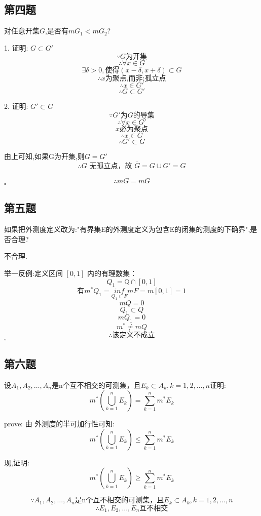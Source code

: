 \documentclass[a4paper]{article}
\begin{document}
    \subsection{第四题}
    对任意开集$G$,是否有$mG_1<mG_2$?

        1. 证明: $G \subset G'$
        \[\because G \text{为开集}\]
        \[\therefore \forall x \in G\]
        \[\exists \delta > 0,\text{使得}(x-\delta,x+\delta)\subset G\]
        \[\therefore x \text{为聚点,而非;孤立点}\]
        \[\therefore x \in G'\]
        \[\therefore G \subset G'\]

        2. 证明: $G' \subset G$
        \[\because G'\text{为} G \text{的导集}\]
        \[\therefore \forall x \in G'\]
        \[x \text{必为聚点}\]
        \[\therefore x \in G\]
        \[\therefore G' \subset G\]

        由上可知,如果G为开集,则$G = G'$
        \[\therefore G \text{ 无孤立点，故 } \overline{G} = G \cup G' = G\]

        \[\therefore m\overline{G}=mG\]
    \hfill $\square$

    \subsection{第五题}
    如果把外测度定义改为:"有界集E的外测度定义为包含E的闭集的测度的下确界",是否合理?

        不合理.

        举一反例:定义区间 $[0,1]$ 内的有理数集：
        \[Q_1=\mathbb{Q}\cap[0,1]\]
        \[\text{有}m^{*}Q_1=\underset{Q_1\subset F}{inf}mF=m[0,1]=1\]
        \[mQ=0\]
        \[Q_1\subset Q\]
        \[mQ_1=0\]
        \[m^{*}\ne mQ\]
        \[\therefore \text{该定义不成立}\]
    \hfill $\square$

    \subsection{第六题}
    设$A_1,A_2,\ldots,A_n$是n个互不相交的可测集，且$E_k \subset A_k,k=1,2,\ldots ,n$证明:
    \[m^*(\bigcup_{k=1}^{n}E_k)=\sum_{k=1}^{n}m^*E_k\]

    prove:
    由 外测度的半可加行性可知:
    \[m^*(\bigcup_{k=1}^{n}E_k) \le \sum_{k=1}^{n}m^*E_k\]
    
    现,证明:
    \[m^*(\bigcup_{k=1}^{n}E_k) \ge \sum_{k=1}^{n}m^*E_k\]

    \[\because A_1,A_2,\ldots,A_n \text{是n个互不相交的可测集，且}E_k \subset A_k,k=1,2,\ldots ,n\]
    \[\therefore E_1,E_2,\ldots ,E_n \text{互不相交}\]
\end{document}
